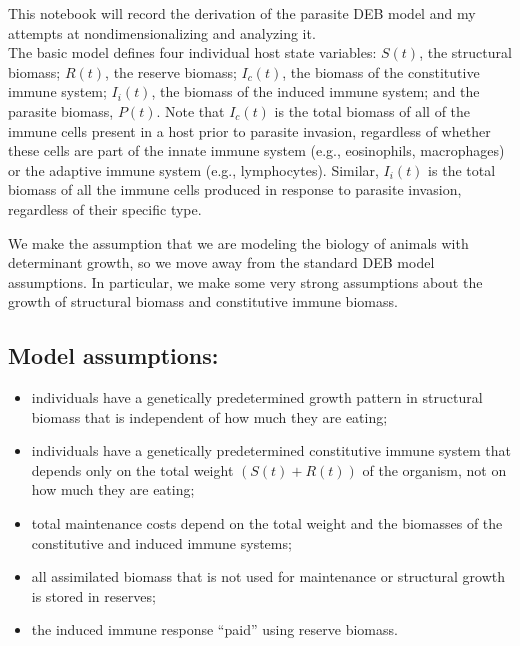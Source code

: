 \documentclass[11pt,reqno,final,pdftex]{amsart}\usepackage[]{graphicx}\usepackage[]{color}
\theoremstyle{plain}
\numberwithin{equation}{part}
\begin{document}
This notebook will record the derivation of the parasite DEB model and my attempts at nondimensionalizing and analyzing it.\\

The basic model defines four individual host state variables: $S(t)$, the structural biomass; $R(t)$, the reserve biomass; $I_c(t)$, the biomass
of the constitutive immune system; $I_i(t)$, the biomass of the induced immune system; and the parasite biomass, $P(t)$. Note that $I_c(t)$
is the total biomass of all of the immune cells present in a host prior to parasite invasion, regardless of whether these cells are part of the innate
immune system (e.g., eosinophils, macrophages) or the adaptive immune system (e.g., lymphocytes). Similar, $I_i(t)$ is the total biomass of all
the immune cells produced in response to parasite invasion, regardless of their specific type.

We make the assumption that we are modeling the biology of animals with determinant growth, so we move away from the standard DEB model assumptions.
In particular, we make some very strong assumptions about the growth of structural biomass and constitutive immune biomass.

\subsection*{Model assumptions:}
\begin{itemize}
\item individuals have a genetically predetermined growth pattern in structural biomass that is independent of how much they are eating;
\item individuals have a genetically predetermined constitutive immune system that depends only on the total weight $(S(t)+R(t))$ of the organism, not on how much they are eating;
\item total maintenance costs depend on the total weight and the biomasses of the constitutive and induced immune systems;
\item all assimilated biomass that is not used for maintenance or structural growth is stored in reserves;
\item the induced immune response ``paid'' using reserve biomass.
\end{itemize}
\end{document}
